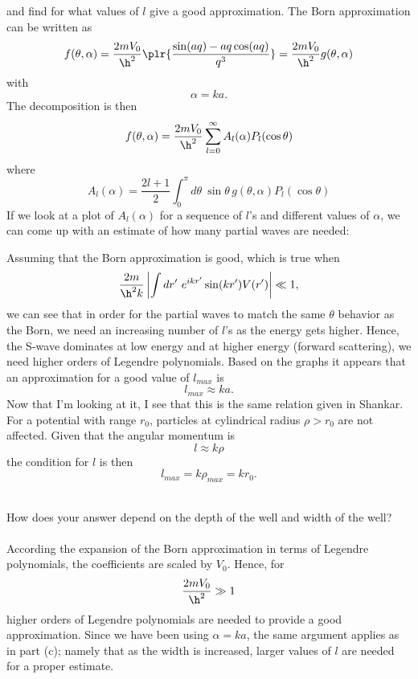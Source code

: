 \documentclass[10pt,letterpaper]{article}
\begin{document}
	and find for what values of $l$ give a good approximation. The Born approximation can
	be written as
	\[
		f(\theta,\alpha) =  \frac{2mV_0}{\h^2}\plr{\frac{\sin(aq)-aq\cos(aq)}{q^3}} =   \frac{2mV_0}{\h^2}g(\theta,\alpha)
	\]
	with 
	\[
		\alpha = ka.
	\]
	The decomposition is then
	\[
		f(\theta,\alpha) = \frac{2mV_0}{\h^2}\sum_{l=0}^{\infty} A_l(\alpha)P_l(\cos\theta)
	\]
	where
	\[
		A_l(\alpha)= \frac{2l+1}{2}\int_0^\pi d\theta\   \sin\theta\, g(\theta,\alpha) P_l(\cos\theta)
	\]
	If we look at a plot of $A_l(\alpha)$ for a sequence of $l$'s and different values of $\alpha$, we can come up
	with an estimate of how many partial waves are needed:
	
	Assuming that the Born approximation is good, which is true when
	\[
		\frac{2m}{\h^2 k}\left|\int dr'\ e^{ikr'}\sin(kr')V(r')\right| \ll 1,
	\]
	we can see that in order for the partial waves to match the same $\theta$ behavior as the Born, we need an increasing
	number of $l$'s as the energy gets higher. Hence, the S-wave dominates at low energy and at higher energy (forward 
	scattering), we need higher orders of Legendre polynomials. Based on the graphs it appears that an approximation
	for a good value of $l_{max}$ is 
	\[
		l_{max} \approx  ka.
	\]
	Now that I'm looking at it, I see that this is the same relation given in Shankar. For a potential with range $r_0$, 
	particles at cylindrical radius $\rho > r_0$ are not affected. Given that the angular momentum is
	\[
		l\approx k\rho
	\]
	the condition for $l$ is then
	\[
		l_{max} = k\rho_{max} = kr_0.
	\]
	\\
	\item
	How does your answer depend on the depth of the well and width of the well?
	\\
	\\
	According the expansion of the Born approximation in terms of Legendre polynomials, the coefficients are
	scaled by $V_0$. Hence, for 
	\[
		\frac{2mV_0}{\h^2} \gg 1
	\]
	higher orders of Legendre polynomials are needed to provide a good approximation. Since we have been using 
	$\alpha = ka$, the same argument applies as in part (c); namely that as the width is increased, larger values
	of $l$ are needed for a proper estimate. 
	\eenum
\eenum
\end{document}
